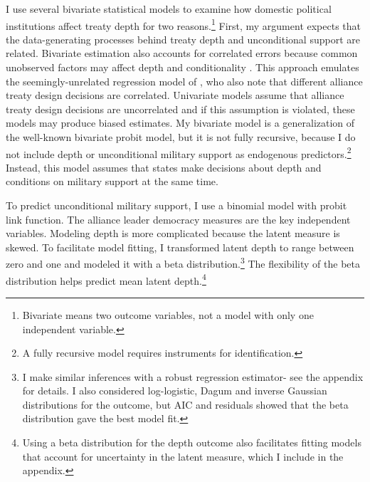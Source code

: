 \documentclass[12pt]{article}
\begin{document}
I use several bivariate statistical models to examine how domestic political institutions affect treaty depth for two reasons.\footnote{Bivariate means two outcome variables, not a model with only one independent variable.} 
First, my argument expects that the data-generating processes behind treaty depth and unconditional support are related. 
Bivariate estimation also accounts for correlated errors because common unobserved factors may affect depth and conditionality \citep{Braumoelleretal2018}.
This approach emulates the seemingly-unrelated regression model of \citet{FjelstulReiter2019}, who also note that different alliance treaty design decisions are correlated. 
Univariate models assume that alliance treaty design decisions are uncorrelated and if this assumption is violated, these models may produce biased estimates. 
My bivariate model is a generalization of the well-known bivariate probit model, but it is not fully recursive, because I do not include depth or unconditional military support as endogenous predictors.\footnote{A fully recursive model requires instruments for identification.}  
Instead, this model assumes that states make decisions about depth and conditions on military support at the same time. 


To predict unconditional military support, I use a binomial model with probit link function. 
The alliance leader democracy measures are the key independent variables.
Modeling depth is more complicated because the latent measure is skewed.
To facilitate model fitting, I transformed latent depth to range between zero and one and modeled it with a beta distribution.\footnote{I make similar inferences with a robust regression estimator- see the appendix for details. I also considered log-logistic, Dagum and inverse Gaussian distributions for the outcome, but AIC and residuals showed that the beta distribution gave the best model fit.}
The flexibility of the beta distribution helps predict mean latent depth.\footnote{Using a beta distribution for the depth outcome also facilitates fitting models that account for uncertainty in the latent measure, which I include in the appendix.} 
\end{document}
